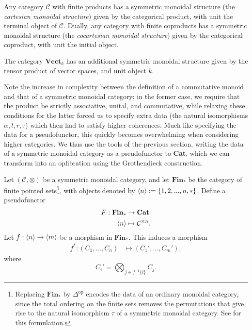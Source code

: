 \documentclass{MetricNotes2023}
\begin{document}
\begin{example}
Any category \(\mathcal{C}\) with finite products has a symmetric monoidal structure (the \textit{cartesian monoidal structure}) given by the categorical product, with unit the terminal object of \(\mathcal{C}\). Dually, any category with finite coproducts has a symmetric monoidal structure (the \textit{cocartesian monoidal structure}) given by the categorical coproduct, with unit the initial object.
\end{example}

\begin{example}
The category \(\textbf{Vect}_k\) has an additional symmetric monoidal structure given by the tensor product of vector spaces, and unit object \(k\). 
\end{example}

Note the increase in complexity between the definition of a commutative monoid and that of a symmetric monoidal category; in the former case, we require that the product be strictly associative, unital, and commutative, while relaxing these conditions for the latter forced us to specify extra data (the natural isomorphisms \(\alpha, l, r, \tau\)) which then had to satisfy higher coherences. Much like specifying the data for a pseudofunctor, this quickly becomes overwhelming when considering higher categories. We thus use the tools of the previous section, writing the data of a symmetric monoidal category as a pseudofunctor to \textbf{Cat}, which we can transform into an opfibration using the Grothendieck construction. 

Let \((\mathcal{C}, \otimes)\) be a symmetric monoidal category, and let \(\textbf{Fin}_*\) be the category of finite pointed sets\footnote{Replacing \(\textbf{Fin}_*\) by \(\Delta^{\text{op}}\) encodes the data of an ordinary monoidal category, since the total ordering on the finite sets removes the permutations that give rise to the natural isomorphism \(\tau\) of a symmetric monoidal category. See \autocite{groth2015short} for this formulation.}, with objects denoted by \(\langle n\rangle:=\{1, 2, ..., n, *\}\). Define a pseudofunctor 
\begin{align*}
F : \textbf{Fin}_* &\to \textbf{Cat}\\
\langle n\rangle&\mapsto \mathcal{C}^{\times n}.
\end{align*}
Let \(f : \langle n\rangle\to \langle m\rangle\) be a morphism in \(\textbf{Fin}_*\). This induces a morphism 
\begin{align*}
f^* : (C_1, ...,C_n) &\mapsto (C_1', ..., C_m'),	
\end{align*}
where
\[C_i' = \bigotimes_{j \in f^{-1}\{i\}}C_j.\]
\end{document}
